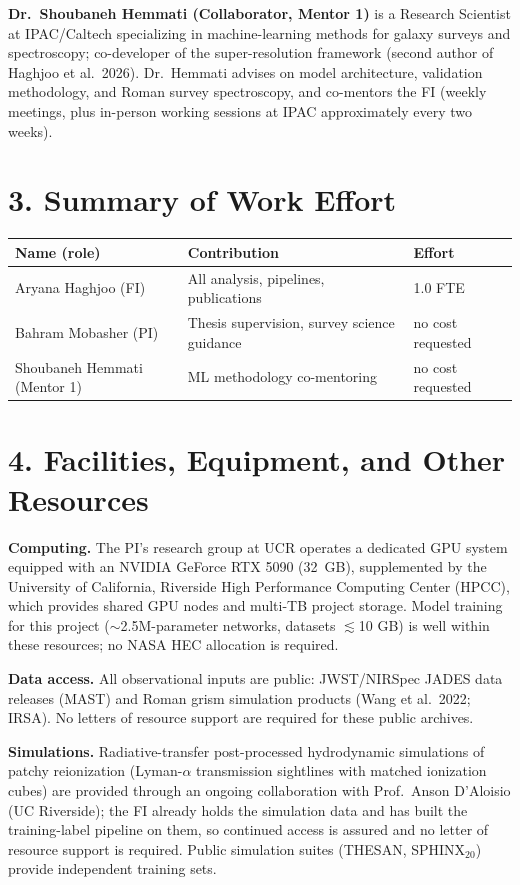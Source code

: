 \documentclass[12pt,letterpaper]{article}
\begin{document}
\textbf{Dr.\ Shoubaneh Hemmati (Collaborator, Mentor 1)} is a Research
Scientist at IPAC/Caltech specializing in machine-learning methods for
galaxy surveys and spectroscopy; co-developer of the super-resolution
framework (second author of Haghjoo et al.\ 2026). Dr.\ Hemmati advises
on model architecture, validation methodology, and Roman survey
spectroscopy, and co-mentors the FI (weekly meetings, plus in-person
working sessions at IPAC approximately every two weeks).

\section*{3. Summary of Work Effort}
\begin{center}
\begin{tabular}{lll}
\toprule
Name (role) & Contribution & Effort \\
\midrule
Aryana Haghjoo (FI) & All analysis, pipelines, publications & 1.0 FTE \\
Bahram Mobasher (PI) & Thesis supervision, survey science guidance & no cost requested \\
Shoubaneh Hemmati (Mentor 1) & ML methodology co-mentoring & no cost requested \\
\bottomrule
\end{tabular}
\end{center}

\section*{4. Facilities, Equipment, and Other Resources}

\textbf{Computing.} The PI's research group at UCR operates a dedicated
GPU system equipped with an NVIDIA GeForce RTX 5090 (32~GB), supplemented
by the University of California, Riverside High Performance Computing
Center (HPCC), which provides shared GPU nodes and multi-TB project
storage. Model training for this project ($\sim$2.5M-parameter networks,
datasets $\lesssim$10 GB) is well within these resources; no NASA HEC
allocation is required.

\textbf{Data access.} All observational inputs are public: JWST/NIRSpec
JADES data releases (MAST) and Roman grism simulation products (Wang et
al.\ 2022; IRSA). No letters of resource support are required for these
public archives.

\textbf{Simulations.} Radiative-transfer post-processed hydrodynamic
simulations of patchy reionization (Lyman-$\alpha$ transmission
sightlines with matched ionization cubes) are provided through an
ongoing collaboration with Prof.\ Anson D'Aloisio (UC Riverside); the
FI already holds the simulation data and has built the training-label
pipeline on them, so continued access is assured and no letter of
resource support is required. Public simulation suites (THESAN,
SPHINX$_{20}$) provide independent training sets.
\end{document}
